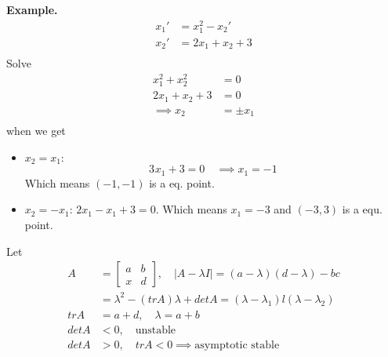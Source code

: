 \documentclass{article}
\theoremstyle{remark}
\begin{document}
  \begin{tcolorbox}
    \textbf{Example.}  \[
    \begin{split}
      x_{1}'   & = x_{1} ^2 - x_{2}  '  \\
      x_{2} '  &=  2x_{1} + x_{2} + 3 \\
    \end{split} 
    \] 
    Solve  \[
      \begin{split}
    x_{1} ^2 + x_{2} ^2  &=  0 \\
    2x_{1} + x_{2} + 3 &=  0 \\
    \implies   x_{2} &=  \pm x_{1} \\
      \end{split} 
    \] 
    when we get 
    \begin{itemize}
      \item $x_{2} = x_{1}$: \[
      3_{} x_{1} + 3 = 0 \quad  \implies  x_{1} = -1 
      \] 
      Which means $\left( -1, -1 \right)$ is a eq. point. 
    \item $x_{2} = -x_{1}$: $2x_{1} - x_{1} + 3 = 0$. Which means $x_{1} = -3$ and $\left( -3, 3 \right)$ is a equ. point.
    \end{itemize}
  \end{tcolorbox}

  Let \[
    \begin{split}
  A  & = \begin{bmatrix} 
    a  &  b \\
    x  &  d
  \end{bmatrix}  , \quad  \left\lvert A - \lambda I  \right\rvert   =  \left( a-\lambda  \right) \left( d - \lambda  \right) -bc \\
  &=  \lambda ^2 - \left( trA  \right) \lambda  + det A = \left( \lambda  - \lambda _{1}  \right) l\left( \lambda  - \lambda _{2} \right) \\
     trA &=   a +d , \quad  \lambda  = a + b  \\
     det A  &  < 0, \quad  \text{unstable}  \\
     det A  & >0 ,\quad   trA < 0  \implies  \text{asymptotic stable}
    \end{split} 
  \] 
\end{document}
